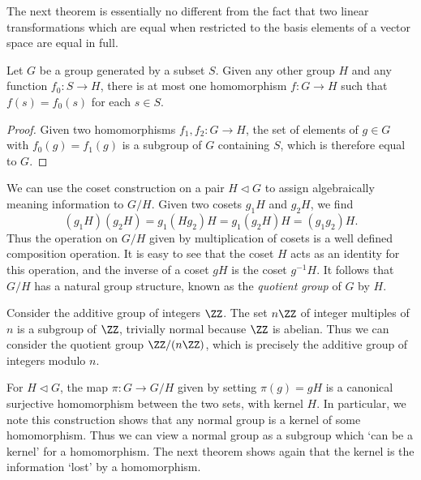 The next theorem is essentially no different from the fact that two linear transformations which are equal when restricted to the basis elements of a vector space are equal in full.

\begin{theorem}
    Let $G$ be a group generated by a subset $S$. Given any other group $H$ and any function $f_0: S \to H$, there is at most one homomorphism $f: G \to H$ such that $f(s) = f_0(s)$ for each $s \in S$.
\end{theorem}
\begin{proof}
    Given two homomorphisms $f_1,f_2: G \to H$, the set of elements of $g \in G$ with $f_0(g) = f_1(g)$ is a subgroup of $G$ containing $S$, which is therefore equal to $G$.
\end{proof}

We can use the coset construction on a pair $H \lhd G$ to assign algebraically meaning information to $G/H$. Given two cosets $g_1H$ and $g_2H$, we find
%
\[ (g_1H)(g_2H) = g_1(Hg_2)H = g_1(g_2H)H = (g_1g_2)H. \]
%
Thus the operation on $G/H$ given by multiplication of cosets is a well defined composition operation. It is easy to see that the coset $H$ acts as an identity for this operation, and the inverse of a coset $gH$ is the coset $g^{-1}H$. It follows that $G/H$ has a natural group structure, known as the \emph{quotient group} of $G$ by $H$.

\begin{example}
    Consider the additive group of integers $\ZZ$. The set $n \ZZ$ of integer multiples of $n$ is a subgroup of $\ZZ$, trivially normal because $\ZZ$ is abelian. Thus we can consider the quotient group $\ZZ / (n \ZZ)$, which is precisely the additive group of integers modulo $n$.
\end{example}

For $H \lhd G$, the map $\pi: G \to G/H$ given by setting $\pi(g) = gH$ is a canonical surjective homomorphism between the two sets, with kernel $H$. In particular, we note this construction shows that any normal group is a kernel of some homomorphism. Thus we can view a normal group as a subgroup which `can be a kernel' for a homomorphism. The next theorem shows again that the kernel is the information `lost' by a homomorphism.

